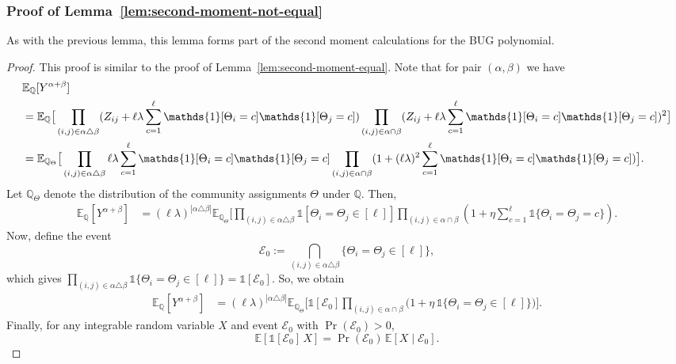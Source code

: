 \documentclass[11pt, letterpaper]{article}
\numberwithin{equation}{section}
\newcommand{\E}{\mathbb{E}}
\newcommand{\QQ}{\mathbb{Q}}
\begin{document}
\subsubsection{Proof of Lemma~\ref{lem:second-moment-not-equal}}
 As with the previous lemma, this lemma forms part of the second moment calculations for the BUG polynomial.
\begin{proof}
This proof is similar to the proof of Lemma~\ref{lem:second-moment-equal}. Note that for pair $(\alpha, \beta)$ we have
{\small \begin{align}
    \notag &\E_\QQ[Y^{\alpha+\beta}]\\
    \notag &=\E_\QQ \big[ \prod_{(i,j) \in \alpha \triangle \beta}( Z_{ij}+\ell\lambda \sum_{c=1}^\ell \mathds{1}[\Theta_i=c]\mathds{1}[\Theta_j=c]) \prod_{(i,j)\in \alpha \cap \beta} (Z_{ij}+\ell\lambda \sum_{c=1}^\ell\mathds{1}[\Theta_i=c]\mathds{1}[\Theta_j=c])^2 \big]\\
    \notag &=\E_{\QQ_\Theta} \big[ \prod_{(i,j) \in \alpha \triangle \beta} \ell\lambda \sum_{c=1}^\ell \mathds{1}[\Theta_i=c]\mathds{1}[\Theta_j=c] \prod_{(i,j)\in \alpha \cap \beta} (1+(\ell\lambda)^2 \sum_{c=1}^\ell\mathds{1}[\Theta_i=c]\mathds{1}[\Theta_j=c])   \big].
    \end{align}}
%
Let $\QQ_\Theta$ denote the distribution of the community assignments $\Theta$ under $\QQ$. Then,
%
 {\small   \begin{align}
    \E_{\QQ}[Y^{\alpha+\beta}] 
    &=(\ell\lambda)^{|\alpha\triangle\beta|}
    \E_{ \QQ_\Theta} \Big[ 
    \prod_{(i,j) \in \alpha \triangle \beta} \mathds{1}[\Theta_i=\Theta_j \in [\ell]] 
  \prod_{(i,j)\in \alpha \cap \beta}
\left(1+\eta\sum_{c=1}^{\ell}\mathds{1}\{\Theta_i=\Theta_j=c\}\right).\label{eq:upper_bound_common_neq}
\end{align}}
\noindent Now, define the event
\[\mathcal E_0:=\bigcap_{(i,j)\in \alpha\triangle\beta}\{\Theta_i=\Theta_j\in[\ell]\},\]
which gives $\prod_{(i,j) \in \alpha \triangle \beta}\mathds{1}\{\Theta_i=\Theta_j\in[\ell]\}
=\mathds{1}[\mathcal E_0].$
So, we obtain
\begin{align*}
\E_\QQ[Y^{\alpha+\beta}]
&=(\ell\lambda)^{|\alpha\triangle\beta|}
\E_{\QQ_\Theta} \Big[ 
\mathds{1}[\mathcal E_0] 
\prod_{(i,j)\in \alpha \cap \beta} \Big(1+\eta\,\mathds{1}\{\Theta_i=\Theta_j\in[\ell]\}\Big) \Big].
\end{align*}
Finally, for any integrable random variable $X$ and event $ \mathcal E_0$ with $\Pr( \mathcal E_0)>0$,
\[
\E[\mathds 1[\mathcal E_0]\,X]=\Pr(\mathcal E_0)\,\E[X\mid \mathcal E_0].
\]
\end{proof}
\end{document}
